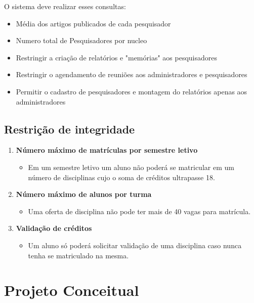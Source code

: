 \documentclass[11pt]{../../classes/ifscarticle}
\begin{document}
O sistema deve realizar esses consultas:
\begin{itemize}
    \item Média dos artigos publicados de cada pesquisador
    \item Numero total de Pesquisadores por nucleo
    \item Restringir a criação de relatórios e "memórias" aos pesquisadores
    \item Restringir o agendamento de reuniões aos administradores e pesquisadores
    \item Permitir o cadastro de pesquisadores e montagem do relatórios apenas aos administradores
\end{itemize}


\subsection{Restrição de integridade}
\label{sec:regrasdenegocio}

\begin{enumerate}
    \item \textbf{Número máximo de matrículas por semestre letivo}
          \begin{itemize}
              \item Em um semestre letivo um aluno não poderá se matricular em um número de disciplinas cujo o soma de créditos ultrapasse 18.
          \end{itemize}
    \item \textbf{Número máximo de alunos por turma}
          \begin{itemize}
              \item Uma oferta de disciplina não pode ter mais de 40 vagas para matrícula.
          \end{itemize}
    \item \textbf{Validação de créditos}
          \begin{itemize}
              \item Um aluno só poderá solicitar validação de uma disciplina caso nunca tenha se matriculado na mesma.
          \end{itemize}
\end{enumerate}
\clearpage

\section{Projeto Conceitual}
\end{document}
